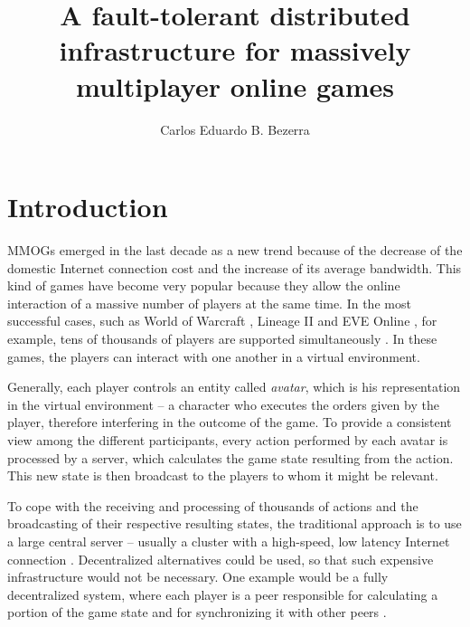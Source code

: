 \documentclass[]{usiinfprospectus}
\author{Carlos Eduardo B. Bezerra}
\title{A fault-tolerant distributed infrastructure for massively multiplayer online games}
\begin{document}
\maketitle

\section{Introduction} \label{sec:introduction}

MMOGs emerged in the last decade as a new trend because of the decrease of the domestic Internet connection cost and the increase of its average bandwidth. This kind of games have become very popular because they allow the online interaction of a massive number of players at the same time. In the most successful cases, such as World of Warcraft \cite{worldofwarcraft}, Lineage II \cite{lineage2} and EVE Online \cite{eveonline}, for example, tens of thousands of players are supported simultaneously \cite{chen2006pch}. In these games, the players can interact with one another in a virtual environment.

Generally, each player controls an entity called \emph{avatar}, which is his representation in the virtual environment -- a character who executes the orders given by the player, therefore interfering in the outcome of the game. To provide a consistent view among the different participants, every action performed by each avatar is processed by a server, which calculates the game state resulting from the action. This new state is then broadcast to the players to whom it might be relevant.%

To cope with the receiving and processing of thousands of actions and the broadcasting of their respective resulting states, the traditional approach is to use a large central server -- usually a cluster with a high-speed, low latency Internet connection \cite{feng2007wnn}. Decentralized alternatives could be used, so that such expensive infrastructure would not be necessary. One example would be a fully decentralized system, where each player is a peer responsible for calculating a portion of the game state and for synchronizing it with other peers \cite{rieche2007ppb, hampel2006ppa, elrhalibi2005abm, iimura2004zfg, knutsson2004pps}.
\end{document}
